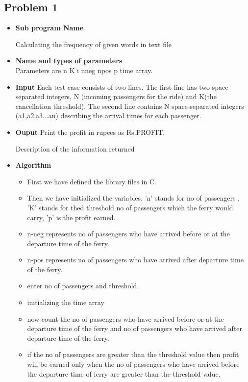 \documentclass[11pt,a4paper]{article}
\begin{document}
\subsection{Problem 1}
\begin{itemize}
\item\textbf{Sub program Name}

{Calculating the frequency of given words in text file}
\item\textbf{Name and types of parameters} \\
Parameters are n K i nneg npos p time array.

\item\textbf{Input}
 Each test case consists of two lines. The first line has two space-separated integers, N  (incoming passengers for the ride) and K(the cancellation threshold). The second line contains  N space-separated integers (a1,a2,a3...an) describing the arrival times for each passenger.\\

   

\item\textbf{Ouput}
Print the profit in rupees as Rs.PROFIT.

Description of the information returned 
\item\textbf{Algorithm}
\begin{itemize}
\item First we have defined the library files in C.
\item Then we have initialized the variables. 'n' stands for no of passengers , 'K' stands for thed threshold no of passengers which the ferry would carry, 'p' is the profit earned.  
\item n-neg represents no of passengers who have arrived before or at the departure time of the ferry.
\item n-pos represents no of passengers who have arrived after departure time of the ferry.
\item enter no of passengers and threshold.
\item initializing the time array
\item now count the no of passengers who have arrived before or at the departure time of the ferry and no of passengers who have arrived after departure time of the ferry.
\item if the no of passengers are greater than the threshold value then profit will be earned only when the no of passengers who have arrived before the departure time of ferry are greater than the threshold value.\\

\end{itemize}


\end{itemize}
\end{document}
